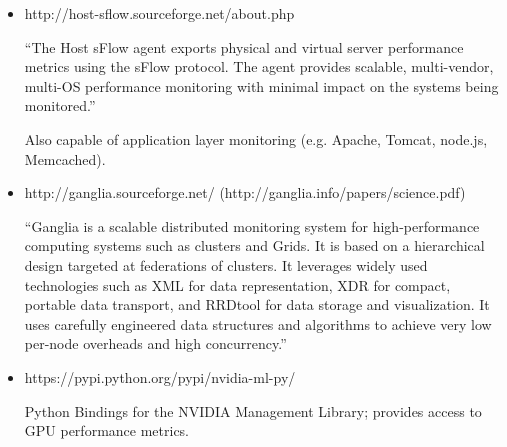 \begin{itemize}

\item http://host-sflow.sourceforge.net/about.php

``The Host sFlow agent exports physical and virtual server performance metrics using the sFlow protocol. The agent
provides scalable, multi-vendor, multi-OS performance monitoring with minimal impact on the systems being monitored.''

Also capable of application layer monitoring (e.g. Apache, Tomcat, node.js, Memcached).

\item http://ganglia.sourceforge.net/ (http://ganglia.info/papers/science.pdf)

``Ganglia is a scalable distributed monitoring system for high-performance computing systems such as clusters and
Grids. It is based on a hierarchical design targeted at federations of clusters. It leverages widely used technologies
such as XML for data representation, XDR for compact, portable data transport, and RRDtool for data storage and
visualization. It uses carefully engineered data structures and algorithms to achieve very low per-node overheads and
high concurrency.''

\item https://pypi.python.org/pypi/nvidia-ml-py/

Python Bindings for the NVIDIA Management Library; provides access to GPU performance metrics.

\end{itemize}
